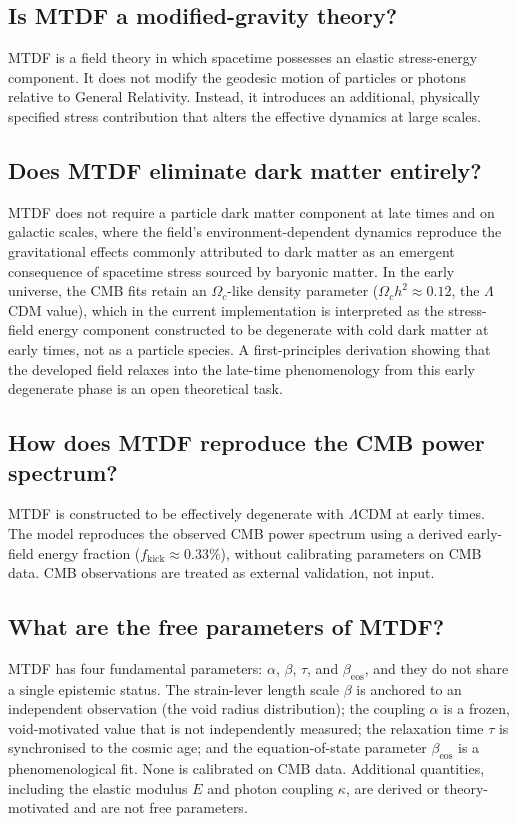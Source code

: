 \documentclass[11pt,a4paper]{article}
\begin{document}
\subsection{Is MTDF a modified-gravity theory?}
MTDF is a field theory in which spacetime possesses an elastic stress-energy component. It does not modify the geodesic motion of particles or photons relative to General Relativity. Instead, it introduces an additional, physically specified stress contribution that alters the effective dynamics at large scales.

\subsection{Does MTDF eliminate dark matter entirely?}
MTDF does not require a particle dark matter component at late times and on galactic scales, where the field's environment-dependent dynamics reproduce the gravitational effects commonly attributed to dark matter as an emergent consequence of spacetime stress sourced by baryonic matter. In the early universe, the CMB fits retain an $\Omega_c$-like density parameter ($\Omega_c h^2 \approx 0.12$, the $\Lambda$CDM value), which in the current implementation is interpreted as the stress-field energy component constructed to be degenerate with cold dark matter at early times, not as a particle species. A first-principles derivation showing that the developed field relaxes into the late-time phenomenology from this early degenerate phase is an open theoretical task.

\subsection{How does MTDF reproduce the CMB power spectrum?}
MTDF is constructed to be effectively degenerate with $\Lambda$CDM at early times. The model reproduces the observed CMB power spectrum using a derived early-field energy fraction ($f_{\text{kick}} \approx 0.33\%$), without calibrating parameters on CMB data. CMB observations are treated as external validation, not input.

\subsection{What are the free parameters of MTDF?}
MTDF has four fundamental parameters: $\alpha$, $\beta$, $\tau$, and $\beta_{\text{eos}}$, and they do not share a single epistemic status. The strain-lever length scale $\beta$ is anchored to an independent observation (the void radius distribution); the coupling $\alpha$ is a frozen, void-motivated value that is not independently measured; the relaxation time $\tau$ is synchronised to the cosmic age; and the equation-of-state parameter $\beta_{\text{eos}}$ is a phenomenological fit. None is calibrated on CMB data. Additional quantities, including the elastic modulus $E$ and photon coupling $\kappa$, are derived or theory-motivated and are not free parameters.
\end{document}
